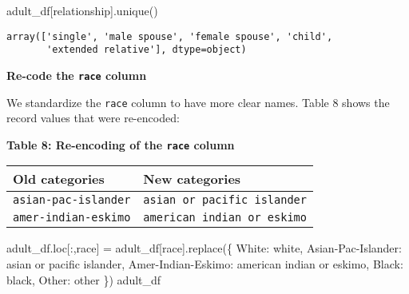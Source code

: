 \documentclass[
  letterpaper,
  DIV=11,
  numbers=noendperiod]{scrartcl}
\newenvironment{Shaded}{\begin{snugshade}}{\end{snugshade}}
\newcommand{\NormalTok}[1]{\textcolor[rgb]{0.00,0.23,0.31}{#1}}
\newcommand{\OperatorTok}[1]{\textcolor[rgb]{0.37,0.37,0.37}{#1}}
\newcommand{\StringTok}[1]{\textcolor[rgb]{0.13,0.47,0.30}{#1}}
\begin{document}
\begin{Shaded}
\begin{Highlighting}[]
\NormalTok{adult\_df[}\StringTok{\textquotesingle{}relationship\textquotesingle{}}\NormalTok{].unique()}
\end{Highlighting}
\end{Shaded}

\begin{verbatim}
array(['single', 'male spouse', 'female spouse', 'child',
       'extended relative'], dtype=object)
\end{verbatim}

\textbf{Re-code the \texttt{race} column}

We standardize the \texttt{race} column to have more clear names. Table
8 shows the record values that were re-encoded:

\textbf{Table 8: Re-encoding of the \texttt{race} column}

\begin{longtable}[]{@{}ll@{}}
\toprule\noalign{}
Old categories & New categories \\
\midrule\noalign{}
\endhead
\bottomrule\noalign{}
\endlastfoot
\texttt{asian-pac-islander} & \texttt{asian\ or\ pacific\ islander} \\
\texttt{amer-indian-eskimo} & \texttt{american\ indian\ or\ eskimo} \\
\end{longtable}

\begin{Shaded}
\begin{Highlighting}[]
\NormalTok{adult\_df.loc[:,}\StringTok{\textquotesingle{}race\textquotesingle{}}\NormalTok{] }\OperatorTok{=}\NormalTok{ adult\_df[}\StringTok{\textquotesingle{}race\textquotesingle{}}\NormalTok{].replace(\{}
    \StringTok{\textquotesingle{}White\textquotesingle{}}\NormalTok{: }\StringTok{\textquotesingle{}white\textquotesingle{}}\NormalTok{,}
    \StringTok{\textquotesingle{}Asian{-}Pac{-}Islander\textquotesingle{}}\NormalTok{: }\StringTok{\textquotesingle{}asian or pacific islander\textquotesingle{}}\NormalTok{,}
    \StringTok{\textquotesingle{}Amer{-}Indian{-}Eskimo\textquotesingle{}}\NormalTok{: }\StringTok{\textquotesingle{}american indian or eskimo\textquotesingle{}}\NormalTok{,}
    \StringTok{\textquotesingle{}Black\textquotesingle{}}\NormalTok{: }\StringTok{\textquotesingle{}black\textquotesingle{}}\NormalTok{,}
    \StringTok{\textquotesingle{}Other\textquotesingle{}}\NormalTok{: }\StringTok{\textquotesingle{}other\textquotesingle{}}
\NormalTok{\})}
\NormalTok{adult\_df}
\end{Highlighting}
\end{Shaded}
\end{document}
